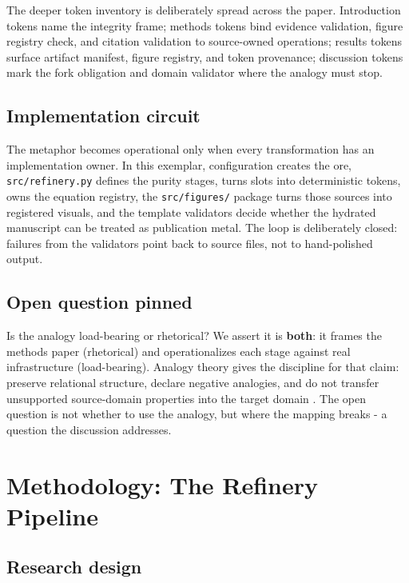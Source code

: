 \documentclass[
  english,
]{article}
\begin{document}
The deeper token inventory is deliberately spread across the paper.
Introduction tokens name the integrity frame; methods tokens bind
evidence validation, figure registry check, and citation validation to
source-owned operations; results tokens surface artifact manifest,
figure registry, and token provenance; discussion tokens mark the fork
obligation and domain validator where the analogy must stop.

\subsection{Implementation circuit}\label{implementation-circuit}

The metaphor becomes operational only when every transformation has an
implementation owner. In this exemplar, configuration creates the ore,
\texttt{src/refinery.py} defines the purity stages,
 turns slots into deterministic tokens,
 owns the equation registry, the
\texttt{src/figures/} package turns those sources into registered
visuals, and the template validators decide whether the hydrated
manuscript can be treated as publication metal. The loop is deliberately
closed: failures from the validators point back to source files, not to
hand-polished output.

\subsection{Open question pinned}\label{open-question-pinned}

Is the analogy load-bearing or rhetorical? We assert it is
\textbf{both}: it frames the methods paper (rhetorical) and
operationalizes each stage against real infrastructure (load-bearing).
Analogy theory gives the discipline for that claim: preserve relational
structure, declare negative analogies, and do not transfer unsupported
source-domain properties into the target domain
\citep{gentner1983structure, hesse1966models, holyoak_thagard_1995}. The
open question is not whether to use the analogy, but where the mapping
breaks - a question the discussion addresses.

\newpage

\section{Methodology: The Refinery Pipeline}\label{sec:methodology}

\subsection{Research design}\label{research-design}
\end{document}
